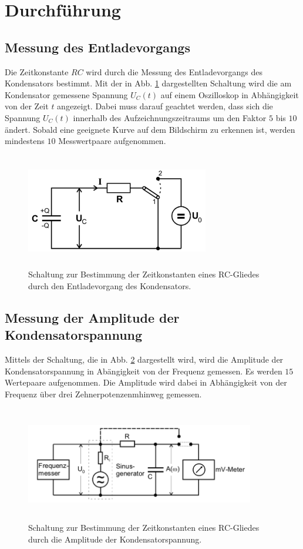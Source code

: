 \section{Durchführung}
\label{sec:Durchführung}

\subsection{Messung des Entladevorgangs}
Die Zeitkonstante $RC$ wird durch die Messung des Entladevorgangs des Kondensators bestimmt. 
Mit der in Abb. \ref{fig:4a} dargestellten Schaltung wird die am Kondensator gemessene Spannung $U_{C}(t)$ auf einem
Oszilloskop in Abhängigkeit von der Zeit $t$ angezeigt. Dabei muss darauf geachtet werden, dass sich die Spannung 
$U_{C}(t)$ innerhalb des Aufzeichnungszeitraums um den Faktor $5$ bis $10$ ändert. Sobald eine geeignete Kurve auf dem 
Bildschirm zu erkennen ist, werden mindestens $10$ Messwertpaare aufgenommen.
\begin{figure}
  \centering
  \includegraphics[width= 8cm, height=5cm]{build/4a.png}
  \caption{Schaltung zur Bestimmung der Zeitkonstanten eines RC-Gliedes durch den Entladevorgang des Kondensators.\cite{versuch}}
  \label{fig:4a}
\end{figure}

\subsection{Messung der Amplitude der Kondensatorspannung}
Mittels der Schaltung, die in Abb. \ref{fig:4b} dargestellt wird, wird die Amplitude der Kondensatorspannung in 
Abängigkeit von der Frequenz gemessen. Es werden $15$ Wertepaare aufgenommen.
Die Amplitude wird dabei in Abhängigkeit von der Frequenz über drei Zehnerpotenzenmhinweg gemessen.
\begin{figure}
  \centering
  \includegraphics[width=10cm, height=5cm]{build/4b.png}
  \caption{Schaltung zur Bestimmung der Zeitkonstanten eines RC-Gliedes durch die Amplitude der Kondensatorspannung.\cite{versuch}}
  \label{fig:4b}
\end{figure}

